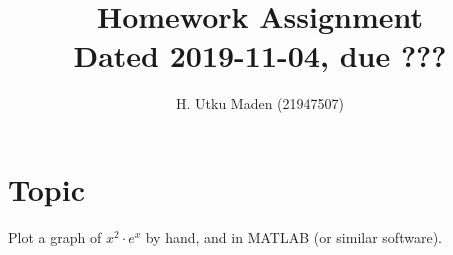 \documentclass[12pt,a4paper]{ltxguide}
\title{
Homework Assignment\\
{\small Dated 2019-11-04, due ???}
}
\author{H. Utku Maden (21947507)}
\begin{document}
    
\maketitle

\section{Topic}

Plot a graph of \(x^2\cdot e^x\) by hand, and in MATLAB (or similar software).


\end{document}
